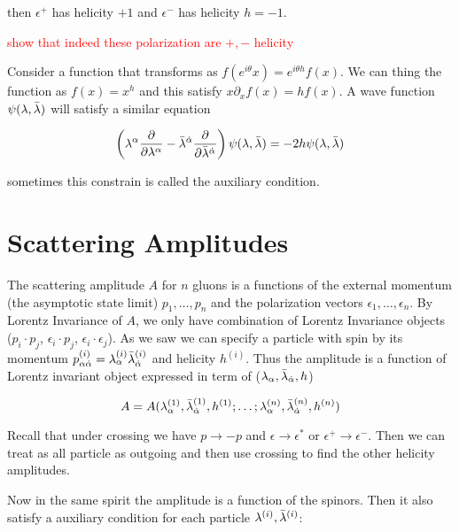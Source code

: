 then $\epsilon^{+}$ has helicity $+1$ and $\epsilon^{-}$ has helicity $h=-1$. 


\textcolor{red}{show that indeed these polarization are $+, -$ helicity}



Consider a function that transforms as $f(e^{i\theta}x) = e^{i\theta h}f(x)$. We can thing the function as $f(x) = x^{h}$ and this satisfy $x \partial_{x} f(x) = h f(x)$. A wave function $\psi(\lambda,\bar{\lambda})$  will satisfy a similar equation


\begin{equation}
\left( \lambda^{\alpha} \frac{\partial}{\partial\lambda^{\alpha}} - \bar{\lambda}^{\dot{\alpha}} \frac{\partial}{\partial\bar{\lambda}^{\dot{\alpha}}} \right)\psi(\lambda,\bar{\lambda}) = -2h \psi(\lambda,\bar{\lambda})
\end{equation}

sometimes this constrain is called the auxiliary condition.

\section{Scattering Amplitudes}


The scattering amplitude $A$ for $n$ gluons is a functions of the external momentum (the asymptotic state limit) $p_{1}, \dots, p_{n}$ and the polarization vectors $\epsilon_{1}, \dots ,\epsilon_{n} $. By Lorentz Invariance of  $A$,  we only have combination of Lorentz Invariance objects ($p_{i}\cdot p_{j}$, $\epsilon_{i}\cdot p_{j}$,  $\epsilon_{i}\cdot \epsilon_{j} $). As we saw we can specify a particle with spin by its momentum $p_{\alpha \dot{\alpha}}^{(i)} = \lambda_{\alpha}^{(i)}\bar{\lambda}_{\dot{\alpha}}^{(i)}$ and helicity $h^{(i)}$. Thus the amplitude is a function of Lorentz invariant object expressed in term of ($\lambda_{\alpha},\bar{\lambda}_{\dot{\alpha}}, h$)

\begin{equation}
A = A(\lambda_{\alpha}^{(1)},\bar{\lambda}_{\dot{\alpha}}^{(1)},h^{(1)}; \dots  ;\lambda_{\alpha}^{(n)},\bar{\lambda}_{\dot{\alpha}}^{(n)},h^{(n)}  )
\end{equation}

Recall that under crossing we have $p \rightarrow -p$ and $\epsilon \rightarrow \epsilon^{*} $ or $\epsilon^{+} \rightarrow \epsilon^{-} $. Then we can treat as all particle as outgoing and then use crossing to find the other helicity amplitudes. 

Now in the same spirit the amplitude is a function of the spinors. Then it also satisfy a auxiliary condition for each particle $\lambda^{(i)},\bar{\lambda}^{(i)}$:

